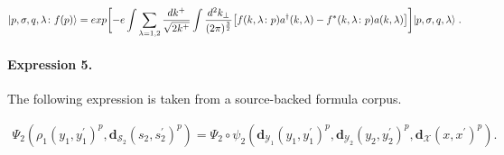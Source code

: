 \documentclass[11pt]{article}
\begin{document}
\begin{align*}\vert p,\sigma,q,\lambda \colon f(p) \rangle = exp\biggl[-e\int\sum_{\lambda=1,2} {{dk^+} \over {\sqrt{2k^+}}} \int {{d^2k_\perp} \over{(2\pi)^{3 \over 2}}}\bigl[f(k,\lambda \colon p)a^\dagger(k,\lambda) - f^*(k,\lambda \colon p)a(k,\lambda)\bigr] \biggr]\vert p,\sigma,q,\lambda \rangle\;.\end{align*}

\paragraph{Expression 5.} The following expression is taken from a source-backed formula corpus.

\begin{align*}\Psi_2 \left( \rho_1(y_1, y_1^\prime)^{p} , \boldsymbol{d}_{\mathcal{S}_2}(s_2, s_2^\prime)^p \right) = \Psi_2 \circ \psi_2 \left( \boldsymbol{d}_{\mathcal{Y}_1}(y_1, y_1^\prime)^{p} , \boldsymbol{d}_{\mathcal{Y}_2}(y_2, y_2^\prime )^p , \boldsymbol{d}_{\mathcal{X}}(x, x^\prime)^p \right).\end{align*}
\end{document}
